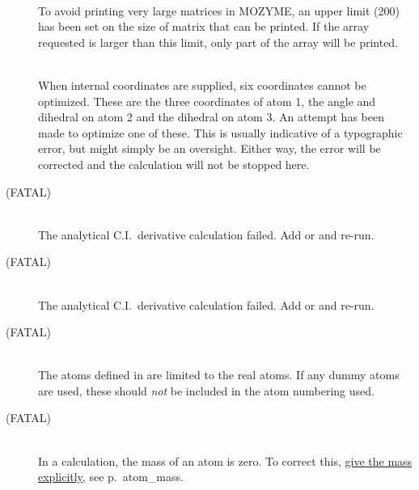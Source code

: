\begin{description}
\item[]~\\
To avoid printing very large matrices in MOZYME, an upper limit (200) 
has been set on the 
size of matrix that can be printed. If the array requested is larger than this
limit, only part of the array will be printed.

\item[]~\\
When internal coordinates are supplied, six coordinates  cannot  be
optimized.   These  are  the  three coordinates of atom 1, the angle and
dihedral on atom 2 and the dihedral on atom 3.  An attempt has been made to 
optimize  one of these.  This is usually indicative of a typographic error, but
might simply be an oversight.  Either way, the error will  be corrected and the
calculation will not be stopped here.

\item[ (FATAL)]~\\
The analytical C.I.\ derivative calculation failed.  Add  or 
 and re-run.

\item[ (FATAL)]~\\
The analytical C.I.\ derivative calculation failed.  Add  or 
 and re-run.

\item[ (FATAL)]~\\
The atoms defined in  are limited to the real atoms.  If any
dummy atoms are used, these should {\em not} be included in the atom
numbering used.

\item[ (FATAL)]~\\
In a  calculation, the mass of an atom is zero.  To correct
this, \hyperref[pageref]{give the mass explicitly}{, see p.~}{}{atom_mass}.


\end{description}
